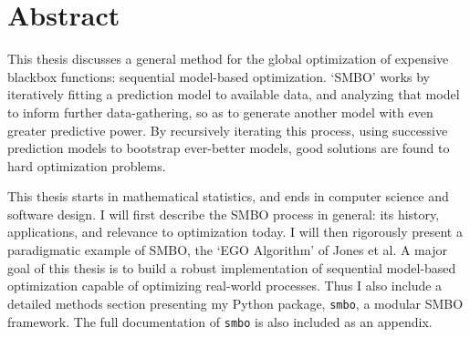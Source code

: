 \chapter*{Abstract}

This thesis discusses a general method for the global optimization of expensive blackbox functions: sequential model-based optimization. `SMBO' works by iteratively fitting a prediction model to available data, and analyzing that model to inform further data-gathering, so as to generate another model with even greater predictive power. By recursively iterating this process, using successive prediction models to bootstrap ever-better models, good solutions are found to hard optimization problems.

This thesis starts in mathematical statistics, and ends in computer science and software design. I will first describe the SMBO process in general: its history, applications, and relevance to optimization today. I will then rigorously present a paradigmatic example of SMBO, the `EGO Algorithm' of Jones et al. A major goal of this thesis is to build a robust implementation of sequential model-based optimization capable of optimizing real-world processes. Thus I also include a detailed methods section presenting my Python package, \texttt{smbo}, a modular SMBO framework. The full documentation of \texttt{smbo} is also included as an appendix.